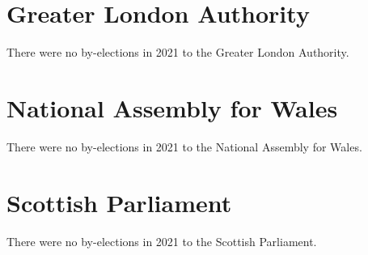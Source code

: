 \documentclass[a4paper,openany]{book}
\begin{document}
\section{Greater London Authority}

There were no by-elections in 2021 to the Greater London Authority.


\section{National Assembly for Wales}

There were no by-elections in 2021 to the National Assembly for Wales.


\section{Scottish Parliament}

There were no by-elections in 2021 to the Scottish Parliament.

%
%
%
\end{document}
